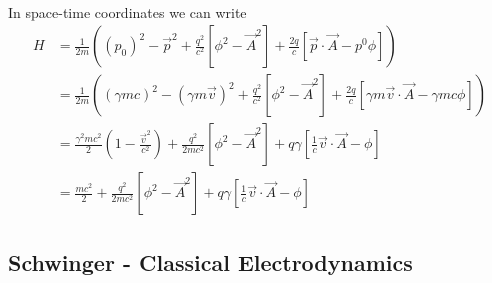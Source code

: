 \documentclass[10pt,a4paper]{article}
\theoremstyle{definition}
\begin{document}
\begin{enumerate}
\begin{align}
\end{align}
In space-time coordinates we can write
\begin{align}
H&=\frac{1}{2m}\left((p_0)^2-\vec{p}^2+\frac{q^2}{c^2}[\phi^2-\vec{A}^2]+\frac{2q}{c}[\vec{p}\cdot\vec{A}-p^0\phi]\right)\\
&=\frac{1}{2m}\left((\gamma m c)^2-(\gamma m\vec{v})^2+\frac{q^2}{c^2}[\phi^2-\vec{A}^2]+\frac{2q}{c}[\gamma m\vec{v}\cdot\vec{A}-\gamma m c\phi]\right)\\
&=\frac{\gamma^2mc^2}{2}\left(1-\frac{\vec{v}^2}{c^2}\right)+\frac{q^2}{2mc^2}[\phi^2-\vec{A}^2]+q\gamma[\frac{1}{c}\vec{v}\cdot\vec{A}- \phi]\\
&=\frac{mc^2}{2}+\frac{q^2}{2mc^2}[\phi^2-\vec{A}^2]+q\gamma[\frac{1}{c}\vec{v}\cdot\vec{A}- \phi]
\end{align}
\end{enumerate}

\subsection{{\sc Schwinger} - Classical Electrodynamics}
\end{document}

